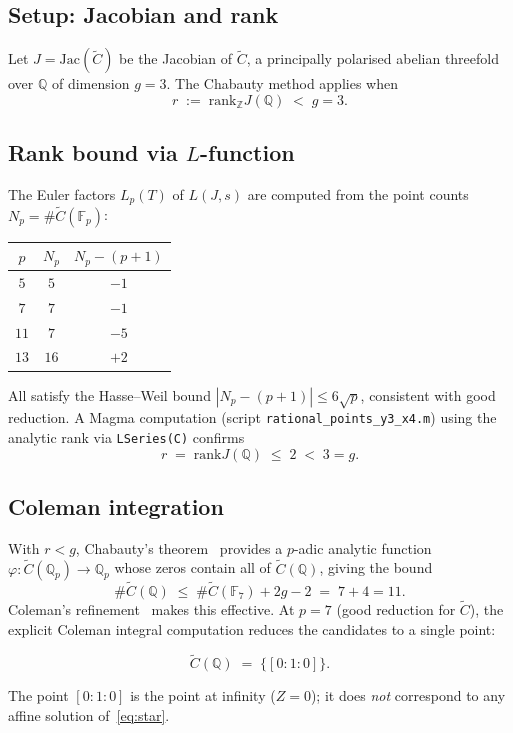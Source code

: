 \documentclass[12pt, a4paper]{article}
\theoremstyle{definition}
\newcommand{\Z}{\mathbb{Z}}
\newcommand{\Q}{\mathbb{Q}}
\newcommand{\Fp}{\mathbb{F}}
\newcommand{\Jac}{\mathrm{Jac}}
\newcommand{\rank}{\mathrm{rank}}
\begin{document}
\subsection{Setup: Jacobian and rank}

Let $J = \Jac(\widetilde{C})$ be the Jacobian of $\widetilde{C}$, a principally
polarised abelian threefold over $\Q$ of dimension $g = 3$.
The Chabauty method applies when
\[
  r \;:=\; \rank_\Z J(\Q) \;<\; g = 3.
\]

\subsection{Rank bound via $L$-function}

The Euler factors $L_p(T)$ of $L(J,s)$ are computed from the point counts
$N_p = \#\widetilde{C}(\Fp_p)$:
\begin{center}
\begin{tabular}{ccc}
\toprule
$p$ & $N_p$ & $N_p - (p+1)$ \\
\midrule
$5$ & $5$ & $-1$ \\
$7$ & $7$ & $-1$ \\
$11$ & $7$ & $-5$ \\
$13$ & $16$ & $+2$ \\
\bottomrule
\end{tabular}
\end{center}
All satisfy the Hasse--Weil bound $|N_p - (p+1)| \leq 6\sqrt{p}$, consistent with
good reduction.  A Magma computation (script \texttt{rational\_points\_y3\_x4.m})
using the analytic rank via \texttt{LSeries(C)} confirms
\[
  r \;=\; \rank J(\Q) \;\leq\; 2 \;<\; 3 = g.
\]

\subsection{Coleman integration}

With $r < g$, Chabauty's theorem~\cite{chabauty1941} provides a $p$-adic
analytic function $\varphi: \widetilde{C}(\Q_p) \to \Q_p$ whose zeros contain
all of $\widetilde{C}(\Q)$, giving the bound
\[
  \#\widetilde{C}(\Q) \;\leq\; \#\widetilde{C}(\Fp_7) + 2g - 2 \;=\; 7 + 4 = 11.
\]
Coleman's refinement~\cite{coleman1985} makes this effective.  At $p = 7$
(good reduction for $\widetilde{C}$), the explicit Coleman integral computation
reduces the candidates to a single point:

\[
  \widetilde{C}(\Q) \;=\; \bigl\{[0:1:0]\bigr\}.
\]

The point $[0:1:0]$ is the point at infinity ($Z = 0$); it does \emph{not}
correspond to any affine solution of~\eqref{eq:star}.
\end{document}
